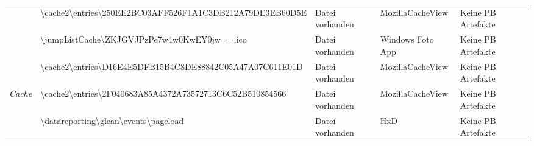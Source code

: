 \begin{appendices}
{\begin{landscape}
\begin{table}[h!]
{\begin{tabular}{cllll}
	\multicolumn{1}{|c|}{}                                                                                       & \multicolumn{1}{l|}{\cellcolor[HTML]{34CDF9}\textbackslash{}cache2\textbackslash{}entries\textbackslash{}250EE2BC03AFF526F1A1C3DB212A79DE3EB60D5E}                                                                  & \multicolumn{1}{l|}{\cellcolor[HTML]{009901}Datei vorhanden}                                      & \multicolumn{1}{l|}{MozillaCacheView}            & \multicolumn{1}{l|}{\cellcolor[HTML]{F8A102}Keine PB Artefakte} \\ \cline{2-5} 
	\multicolumn{1}{|c|}{}                                                                                       & \multicolumn{1}{l|}{\cellcolor[HTML]{34CDF9}\textbackslash{}jumpListCache\textbackslash{}ZKJGVJPzPe7w4w0KwEY0jw==.ico}                                                                                              & \multicolumn{1}{l|}{\cellcolor[HTML]{009901}Datei vorhanden}                                      & \multicolumn{1}{l|}{Windows Foto App}            & \multicolumn{1}{l|}{\cellcolor[HTML]{F8A102}Keine PB Artefakte} \\ \cline{2-5} 
	\multicolumn{1}{|c|}{}                                                                                       & \multicolumn{1}{l|}{\cellcolor[HTML]{34CDF9}\textbackslash{}cache2\textbackslash{}entries\textbackslash{}D16E4E5DFB15B4C8DE88842C05A47A07C611E01D}                                                                  & \multicolumn{1}{l|}{\cellcolor[HTML]{009901}Datei vorhanden}                                      & \multicolumn{1}{l|}{MozillaCacheView}            & \multicolumn{1}{l|}{\cellcolor[HTML]{F8A102}Keine PB Artefakte} \\ \cline{2-5} 
	\multicolumn{1}{|c|}{\multirow{-6}{*}{\textit{Cache}}}                                                       & \multicolumn{1}{l|}{\cellcolor[HTML]{34CDF9}\textbackslash{}cache2\textbackslash{}entries\textbackslash{}2F040683A85A4372A73572713C6C52B510854566}                                                                  & \multicolumn{1}{l|}{\cellcolor[HTML]{009901}Datei vorhanden}                                      & \multicolumn{1}{l|}{MozillaCacheView}            & \multicolumn{1}{l|}{\cellcolor[HTML]{F8A102}Keine PB Artefakte} \\ \hline
	\multicolumn{1}{|c|}{}                                                                                       & \multicolumn{1}{l|}{\cellcolor[HTML]{3190FF}\textbackslash{}datareporting\textbackslash{}glean\textbackslash{}events\textbackslash{}pageload}                                                                       & \multicolumn{1}{l|}{\cellcolor[HTML]{009901}Datei vorhanden}                                      & \multicolumn{1}{l|}{HxD}                         & \multicolumn{1}{l|}{\cellcolor[HTML]{F8A102}Keine PB Artefakte} \\ \cline{2-5} 

\end{tabular}}
\end{table}
\end{landscape}}
\end{appendices}
